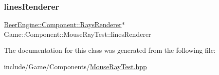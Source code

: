 \mbox{\label{class_game_1_1_component_1_1_mouse_ray_test_a0c6d4f0a878531fcfc83add4258b8eae}} 
\subsubsection{\texorpdfstring{lines\+Renderer}{linesRenderer}}
{\footnotesize\ttfamily \mbox{\hyperlink{class_beer_engine_1_1_component_1_1_rays_renderer}{Beer\+Engine\+::\+Component\+::\+Rays\+Renderer}}$\ast$ Game\+::\+Component\+::\+Mouse\+Ray\+Test\+::lines\+Renderer}



The documentation for this class was generated from the following file\+:\begin{DoxyCompactItemize}
\item 
include/\+Game/\+Components/\mbox{\hyperlink{_mouse_ray_test_8hpp}{Mouse\+Ray\+Test.\+hpp}}\end{DoxyCompactItemize}
